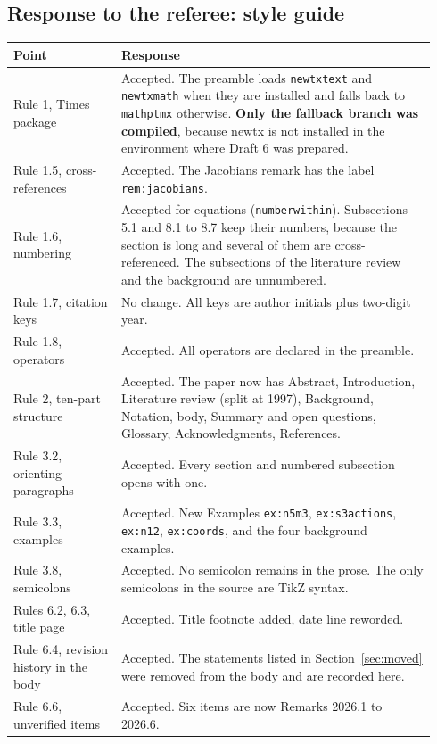 \documentclass[12pt,letterpaper]{article}
\begin{document}
\subsection{Response to the referee: style guide}
\begin{longtable}{@{}p{0.24\linewidth}p{0.70\linewidth}@{}}\toprule
Point & Response\\\midrule\endhead
Rule 1, Times package & Accepted. The preamble loads \texttt{newtxtext} and \texttt{newtxmath} when they are installed and falls back to \texttt{mathptmx} otherwise. \textbf{Only the fallback branch was compiled}, because newtx is not installed in the environment where Draft 6 was prepared.\\
Rule 1.5, cross-references & Accepted. The Jacobians remark has the label \texttt{rem:jacobians}.\\
Rule 1.6, numbering & Accepted for equations (\texttt{numberwithin}). Subsections 5.1 and 8.1 to 8.7 keep their numbers, because the section is long and several of them are cross-referenced. The subsections of the literature review and the background are unnumbered.\\
Rule 1.7, citation keys & No change. All keys are author initials plus two-digit year.\\
Rule 1.8, operators & Accepted. All operators are declared in the preamble.\\
Rule 2, ten-part structure & Accepted. The paper now has Abstract, Introduction, Literature review (split at 1997), Background, Notation, body, Summary and open questions, Glossary, Acknowledgments, References.\\
Rule 3.2, orienting paragraphs & Accepted. Every section and numbered subsection opens with one.\\
Rule 3.3, examples & Accepted. New Examples \texttt{ex:n5m3}, \texttt{ex:s3actions}, \texttt{ex:n12}, \texttt{ex:coords}, and the four background examples.\\
Rule 3.8, semicolons & Accepted. No semicolon remains in the prose. The only semicolons in the source are TikZ syntax.\\
Rules 6.2, 6.3, title page & Accepted. Title footnote added, date line reworded.\\
Rule 6.4, revision history in the body & Accepted. The statements listed in Section~\ref{sec:moved} were removed from the body and are recorded here.\\
Rule 6.6, unverified items & Accepted. Six items are now Remarks 2026.1 to 2026.6.\\

\end{longtable}
\end{document}
